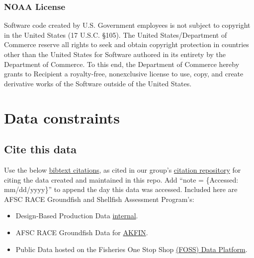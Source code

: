 \documentclass[
  letterpaper,
  oneside,
  open=any]{scrbook}
\begin{document}
\hypertarget{noaa-license}{%
\subsection{NOAA License}\label{noaa-license}}

Software code created by U.S. Government employees is not subject to
copyright in the United States (17 U.S.C. §105). The United
States/Department of Commerce reserve all rights to seek and obtain
copyright protection in countries other than the United States for
Software authored in its entirety by the Department of Commerce. To this
end, the Department of Commerce hereby grants to Recipient a
royalty-free, nonexclusive license to use, copy, and create derivative
works of the Software outside of the United States.

\hypertarget{data-constraints}{%
\chapter{Data constraints}\label{data-constraints}}

\hypertarget{cite-this-data-3}{%
\section{Cite this data}\label{cite-this-data-3}}

Use the below
\href{https://github.com/afsc-gap-products/gap_products/blob/main/CITATION.bib}{bibtext
citations}, as cited in our group's
\href{https://github.com/afsc-gap-products/citations/blob/main/cite/bibliography.bib}{citation
repository} for citing the data created and maintained in this repo. Add
``note = \{Accessed: mm/dd/yyyy\}'' to append the day this data was
accessed. Included here are AFSC RACE Groundfish and Shellfish
Assessment Program's:

\begin{itemize}
\item
  Design-Based Production Data
  \protect\hyperlink{gap-production-data}{internal}.
\item
  AFSC RACE Groundfish Data for \protect\hyperlink{akfin}{AKFIN}.
\item
  Public Data hosted on the Fisheries One Stop Shop
  \protect\hyperlink{public-data-foss}{(FOSS) Data Platform}.
\end{itemize}
\end{document}
